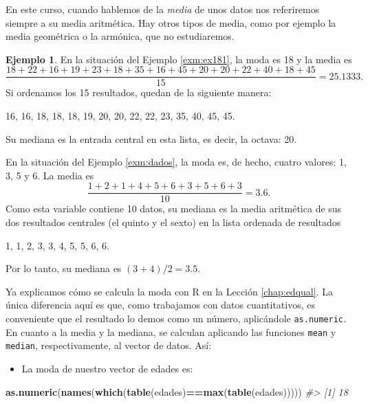 \documentclass[
]{book}
\newenvironment{Shaded}{\begin{snugshade}}{\end{snugshade}}
\newcommand{\CommentTok}[1]{\textcolor[rgb]{0.56,0.35,0.01}{\textit{#1}}}
\newcommand{\KeywordTok}[1]{\textcolor[rgb]{0.13,0.29,0.53}{\textbf{#1}}}
\newcommand{\NormalTok}[1]{#1}
\newcommand{\OperatorTok}[1]{\textcolor[rgb]{0.81,0.36,0.00}{\textbf{#1}}}
\providecommand{\tightlist}{%
  \setlength{\itemsep}{0pt}\setlength{\parskip}{0pt}}
\theoremstyle{definition}
\theoremstyle{definition}
\newtheorem{example}{Ejemplo}[chapter]
\theoremstyle{definition}
\theoremstyle{remark}
\begin{document}
En este curso, cuando hablemos de la \emph{media} de unos datos nos referiremos siempre a su media aritmética. Hay otros tipos de media, como por ejemplo la media geométrica o la armónica, que no estudiaremos.

\begin{example}
\protect\hypertarget{exm:unnamed-chunk-7}{}{\label{exm:unnamed-chunk-7} }En la situación del Ejemplo \ref{exm:ex181}, la moda es 18 y la media es
\[
\frac{18+22+16+19+23+18+35+16+45+20+20+22+40+18+45}{15}=25.1333.
\]
Si ordenamos los 15 resultados, quedan de la siguiente manera:

16, 16, 18, 18, 18, 19, 20, 20, 22, 22, 23, 35, 40, 45, 45.

Su mediana es la entrada central en esta lista, es decir, la octava: 20.
\end{example}

En la situación del Ejemplo \ref{exm:dados}, la moda es, de hecho, cuatro valores: 1, 3, 5 y 6. La media es
\[
\frac{1+2+1+4+5+6+3+5+6+3}{10}=3.6.
\]
Como esta variable contiene 10 datos, su mediana es la media aritmética de sus dos resultados centrales (el quinto y el sexto) en la lista ordenada de resultados

1, 1, 2, 3, 3, 4, 5, 5, 6, 6.

Por lo tanto, su mediana es \((3+4)/2=3.5\).

Ya explicamos cómo se calcula la moda con R en la Lección \ref{chap:edqual}. La única diferencia aquí es que, como trabajamos con datos cuantitativos, es conveniente que el resultado lo demos como un número, aplicándole \texttt{as.numeric}. En cuanto a la media y la mediana, se calculan aplicando las funciones \texttt{mean} y \texttt{median}, respectivamente, al vector de datos. Así:

\begin{itemize}
\tightlist
\item
  La moda de nuestro vector de edades es:
\end{itemize}

\begin{Shaded}
\begin{Highlighting}[]
\KeywordTok{as.numeric}\NormalTok{(}\KeywordTok{names}\NormalTok{(}\KeywordTok{which}\NormalTok{(}\KeywordTok{table}\NormalTok{(edades)}\OperatorTok{==}\KeywordTok{max}\NormalTok{(}\KeywordTok{table}\NormalTok{(edades)))))}
\CommentTok{\#\textgreater{} [1] 18}
\end{Highlighting}
\end{Shaded}
\end{document}

